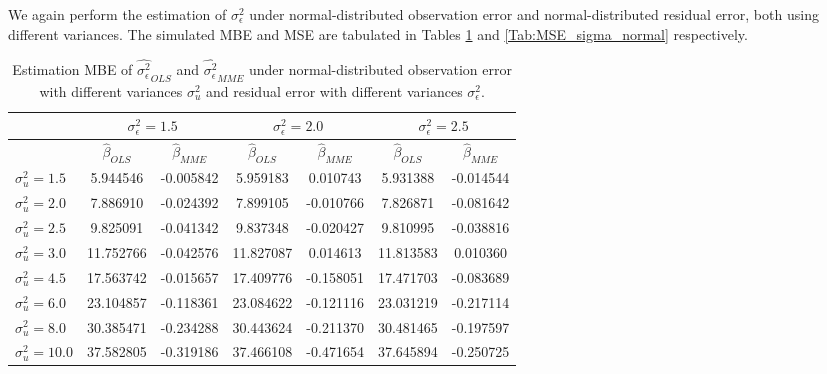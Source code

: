 \documentclass{article}
\begin{document}
We again perform the estimation of $\sigma^2_\epsilon$ under normal-distributed observation error and normal-distributed residual error, both using different variances.
The simulated MBE and MSE are tabulated in Tables \ref{Tab:MBE_sigma_normal} and \ref{Tab:MSE_sigma_normal} respectively.

\begin{table}[ht]
    \centering
    \caption{Estimation MBE of $\hat{\sigma^2_\epsilon}_{OLS}$ and $\hat{\sigma^2_\epsilon}_{MME}$ under normal-distributed observation error with different variances $\sigma^2_u$ and residual error with different variances $\sigma^2_\epsilon$.}
    \label{Tab:MBE_sigma_normal}
    \begin{tabular}[t]{lcccccc}
        \hline
        &\multicolumn{2}{c}{$\sigma^2_\epsilon=1.5$}&\multicolumn{2}{c}{$\sigma^2_\epsilon=2.0$}&\multicolumn{2}{c}{$\sigma^2_\epsilon=2.5$}\\
        \hline
        &$\hat{\beta}_{OLS}$&$\hat{\beta}_{MME}$&$\hat{\beta}_{OLS}$&$\hat{\beta}_{MME}$&$\hat{\beta}_{OLS}$&$\hat{\beta}_{MME}$\\
        \hline
        $\sigma^2_u = 1.5$&5.944546&-0.005842&5.959183&0.010743&5.931388&-0.014544\\
        $\sigma^2_u = 2.0$&7.886910&-0.024392&7.899105&-0.010766&7.826871&-0.081642\\
        $\sigma^2_u = 2.5$&9.825091&-0.041342&9.837348&-0.020427&9.810995&-0.038816\\
        $\sigma^2_u = 3.0$&11.752766&-0.042576&11.827087&0.014613&11.813583&0.010360\\
        $\sigma^2_u = 4.5$&17.563742&-0.015657&17.409776&-0.158051&17.471703&-0.083689\\
        $\sigma^2_u = 6.0$&23.104857&-0.118361&23.084622&-0.121116&23.031219&-0.217114\\
        $\sigma^2_u = 8.0$&30.385471&-0.234288&30.443624&-0.211370&30.481465&-0.197597\\
        $\sigma^2_u = 10.0$&37.582805&-0.319186&37.466108&-0.471654&37.645894&-0.250725\\
    \end{tabular}
\end{table}
\end{document}
